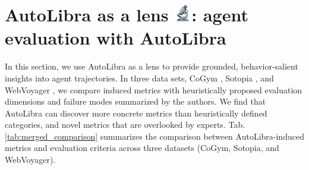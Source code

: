 \section{\texorpdfstring{AutoLibra as a lens \includegraphics[height=1em]{figs/microscope.png}: agent evaluation with AutoLibra}{AutoLibra as a lens: agent evaluation with AutoLibra}}
\label{sec:lens}

In this section, we use AutoLibra as a lens to provide grounded, behavior-salient insights into agent trajectories. In three data sets, CoGym \citep{shao2024collaborative}, Sotopia \citep{zhousotopia}, and WebVoyager \citep{he2024webvoyager}, we compare induced metrics with heuristically proposed evaluation dimensions and failure modes summarized by the authors. We find that AutoLibra can discover more concrete metrics than heuristically defined categories, and novel metrics that are overlooked by experts. 
Tab. \ref{tab:merged_comparison} summarizes the comparison between AutoLibra-induced metrics and evaluation criteria across three datasets (CoGym, Sotopia, and WebVoyager).




